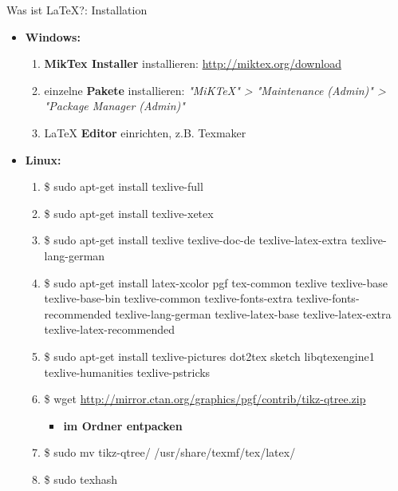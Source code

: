 \begin{frame}{Was ist \LaTeX?: Installation}
\begin{itemize}
\item \textbf{Windows:}
\begin{enumerate}
\item \textbf{MikTex Installer} installieren: \url{http://miktex.org/download}
\item einzelne \textbf{Pakete} installieren: \textit{"MiKTeX" > "Maintenance (Admin)" > "Package Manager (Admin)"}
\item \LaTeX{} \textbf{Editor} einrichten, z.B. Texmaker
\end{enumerate}
\item \textbf{Linux:}
\begin{enumerate}
\item \$ sudo apt-get install texlive-full
\item \$ sudo apt-get install texlive-xetex
\item \$ sudo apt-get install texlive texlive-doc-de texlive-latex-extra texlive-lang-german
\item \$ sudo apt-get install latex-xcolor pgf tex-common texlive texlive-base texlive-base-bin texlive-common texlive-fonts-extra texlive-fonts-recommended texlive-lang-german texlive-latex-base texlive-latex-extra texlive-latex-recommended
\item \$ sudo apt-get install texlive-pictures dot2tex sketch libqtexengine1 texlive-humanities texlive-pstricks
\item \$ wget \url{http://mirror.ctan.org/graphics/pgf/contrib/tikz-qtree.zip}
\begin{itemize}
\item \textbf{im Ordner entpacken}
\end{itemize}

\item \$ sudo mv tikz-qtree/ /usr/share/texmf/tex/latex/
\item \$ sudo texhash
\end{enumerate}
\end{itemize}
\end{frame}